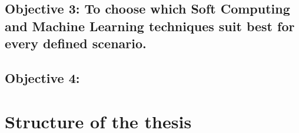 \newcommand{\objectivetechniques}{To choose which Soft Computing and Machine Learning techniques suit best for every defined scenario.}

\subsection*{Objective 3: \objectivetechniques}
\label{subsec:intro:obj:fwork}

\newcommand{\objectiveresearch}{} 

\subsection*{Objective 4: \objectiveresearch}
\label{subsec:intro:obj:applications}



\section{Structure of the thesis}
\label{sec:intro:structure}


